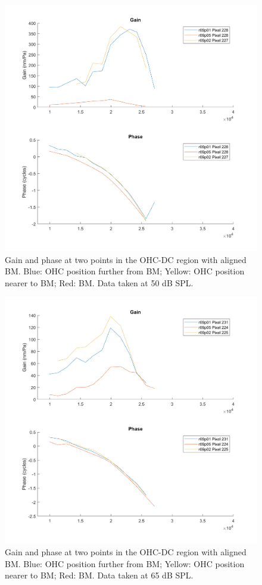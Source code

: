 \documentclass{article}
\begin{document}
\begin{figure}
	\centering
	\includegraphics[width=\textwidth]{Figures/ohcdcp2pts50dB.png}
	\caption{Gain and phase at two points in the OHC-DC region with aligned BM. Blue: OHC position further from BM; Yellow: OHC position nearer to BM; Red: BM. Data taken at 50 dB SPL.}
	\label{2pt50}
\end{figure}

\begin{figure}
	\centering
	\includegraphics[width=\textwidth]{Figures/ohcdcp2pts65dB.png}
	\caption{Gain and phase at two points in the OHC-DC region with aligned BM. Blue: OHC position further from BM; Yellow: OHC position nearer to BM; Red: BM. Data taken at 65 dB SPL.}
	\label{2pt65}
\end{figure}
\end{document}
